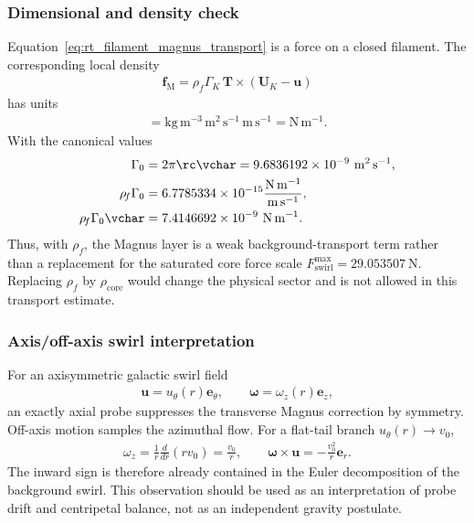 \subsubsection{Dimensional and density check}
    Equation~\eqref{eq:rt_filament_magnus_transport} is a force on a closed
    filament. The corresponding local density
    \begin{align}
        \mathbf{f}_{\mathrm{M}}
        =
        \rho_{\!f}\Gamma_K\,
        \mathbf{T}\times(\mathbf{U}_K-\mathbf{u})
    \end{align}
    has units
    \begin{align}
        [\rho_{\!f}\Gamma_K\Delta U]
        =
        \mathrm{kg\,m^{-3}}\,\mathrm{m^2\,s^{-1}}\,\mathrm{m\,s^{-1}}
        =
        \mathrm{N\,m^{-1}}.
    \end{align}
    With the canonical values
    \begin{align}
        \Gamma_0
        &=
        2\pi \rc\vchar
        =
        9.6836192\times10^{-9}\ \mathrm{m^2\,s^{-1}},\\
        \rho_{\!f}\Gamma_0
        &=
        6.7785334\times10^{-15}
        \frac{\mathrm{N\,m^{-1}}}{\mathrm{m\,s^{-1}}},\\
        \rho_{\!f}\Gamma_0\vchar
        &=
        7.4146692\times10^{-9}\ \mathrm{N\,m^{-1}}.
    \end{align}
    Thus, with \(\rho_{\!f}\), the Magnus layer is a weak background-transport
    term rather than a replacement for the saturated core force scale
    \(F_{\mathrm{swirl}}^{\max}=29.053507\ \mathrm{N}\). Replacing
    \(\rho_{\!f}\) by \(\rho_{\mathrm{core}}\) would change the physical sector and
    is not allowed in this transport estimate.

\subsubsection{Axis/off-axis swirl interpretation}
    For an axisymmetric galactic swirl field
    \begin{align}
        \mathbf{u}=u_\theta(r)\mathbf{e}_\theta,
        \qquad
        \boldsymbol{\omega}=\omega_z(r)\mathbf{e}_z,
    \end{align}
    an exactly axial probe suppresses the transverse Magnus correction by symmetry.
    Off-axis motion samples the azimuthal flow. For a flat-tail branch
    \(u_\theta(r)\to v_0\),
    \begin{align}
        \omega_z
        =
        \frac{1}{r}\frac{d}{dr}\left(r v_0\right)
        =
        \frac{v_0}{r},
        \qquad
        \boldsymbol{\omega}\times\mathbf{u}
        =
        -\frac{v_0^2}{r}\mathbf{e}_r.
    \end{align}
    The inward sign is therefore already contained in the Euler decomposition of
    the background swirl. This observation should be used as an interpretation of
    probe drift and centripetal balance, not as an independent gravity postulate.


